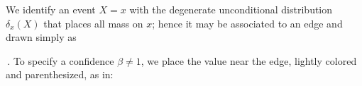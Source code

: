 \documentclass[twoside]{article}
\theoremstyle{plain}
\theoremstyle{definition}
\newcommand{\mat}[1]{\mathbf{#1}}
\newcommand{\ssub}[1]{_{\!_{#1}\!}}
\newcommand{\bp}[1][L]{\mat{p}\ssub{#1}}
\newcommand{\dg}[1]{\mathbdcal{#1}}
\begin{document}
We identify an event $X\!\!=\!x$ with
the degenerate unconditional distribution $\delta_x(X)$ that places all mass on $x$;
hence it may be associated to an edge and drawn simply as
\,.
To specify a confidence $\beta \ne 1$,
%
%
we place the value near the edge, lightly colored and parenthesized, as in:
\end{document}
